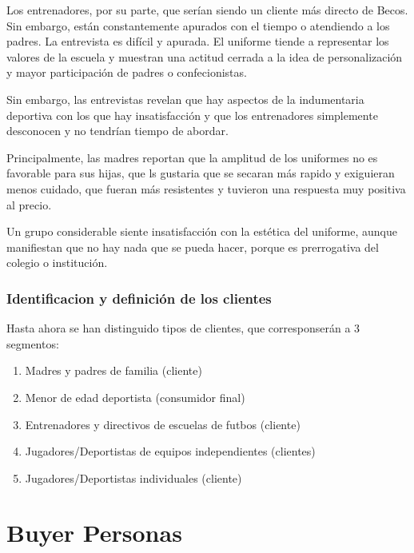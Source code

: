 \documentclass[11pt]{article}
\begin{document}
Los entrenadores, por su parte, que serían siendo un cliente más directo de
Becos. Sin embargo, están constantemente apurados con el tiempo o atendiendo
a los padres. La entrevista es difícil y apurada. El uniforme tiende a
representar los valores de la escuela y muestran una actitud cerrada a la
idea de personalización y mayor participación de padres o confecionistas.


Sin embargo, las entrevistas revelan que hay aspectos de la indumentaria
deportiva con los que hay insatisfacción y que los entrenadores simplemente
desconocen y no tendrían tiempo de abordar.

Principalmente, las madres reportan que la amplitud de los uniformes no es
favorable para sus hijas, que ls gustaria que se secaran más rapido y
exiguieran menos cuidado, que fueran más resistentes y tuvieron una
respuesta muy positiva al precio.

Un grupo considerable siente insatisfacción con la estética del uniforme,
aunque manifiestan que no hay nada que se pueda hacer, porque es
prerrogativa del colegio o institución.




\subsubsection{Identificacion y definición de los clientes}
\label{sec:org61851ef}

Hasta ahora se han distinguido tipos de clientes,
que corresponserán a 3 segmentos:

\begin{enumerate}
\item Madres y padres de familia (cliente)

\item Menor de edad deportista (consumidor final)

\item Entrenadores y directivos de escuelas de futbos (cliente)

\item Jugadores/Deportistas de equipos independientes (clientes)

\item Jugadores/Deportistas individuales (cliente)
\end{enumerate}



\section{Buyer Personas}
\label{sec:org65c9867}
\end{document}
